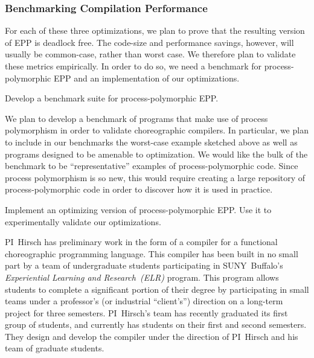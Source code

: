 
\subsubsection{Benchmarking Compilation Performance}

For each of these three optimizations, we plan to prove that the resulting version of EPP is deadlock free.
The code-size and performance savings, however, will usually be common-case, rather than worst case.
We therefore plan to validate these metrics empirically.
In order to do so, we need a benchmark for process-polymorphic EPP and an implementation of our optimizations.

\begin{goal}
  Develop a benchmark suite for process-polymorphic EPP.
\end{goal}

We plan to develop a benchmark of programs that make use of process polymorphism in order to validate choreographic compilers.
In particular, we plan to include in our benchmarks the worst-case example sketched above as well as programs designed to be amenable to optimization.
We would like the bulk of the benchmark to be ``representative'' examples of process-polymorphic code.
Since process polymorphism is so new, this would require creating a large repository of process-polymorphic code in order to discover how it is used in practice.

\begin{goal}
  Implement an optimizing version of process-polymorphic EPP.
  Use it to experimentally validate our optimizations.
\end{goal}

PI~Hirsch has preliminary work in the form of a compiler for a functional choreographic programming language.
This compiler has been built in no small part by a team of undergraduate students participating in SUNY~Buffalo's \emph{Experiential Learning and Research~(ELR)} program.
This program allows students to complete a significant portion of their degree by participating in small teams under a professor's (or industrial ``client's'') direction on a long-term project for three semesters.
PI~Hirsch's team has recently graduated its first group of students, and currently has students on their first and second semesters.
They design and develop the compiler under the direction of PI~Hirsch and his team of graduate students.

